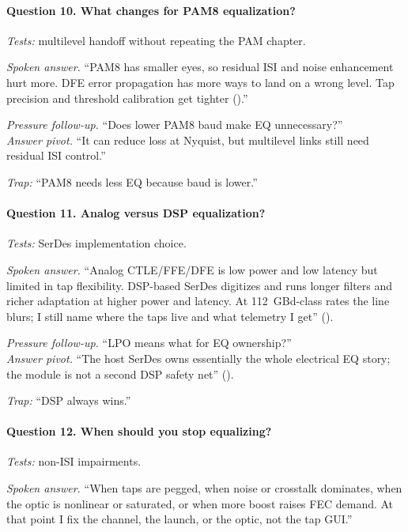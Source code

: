 \paragraph{Question 10. What changes for PAM8 equalization?}
\textit{Tests:} multilevel handoff without repeating the PAM chapter.

\textit{Spoken answer.}
``PAM8 has smaller eyes, so residual ISI and noise enhancement hurt more. DFE
error propagation has more ways to land on a wrong level. Tap precision and
threshold calibration get tighter ().''

\textit{Pressure follow-up.} ``Does lower PAM8 baud make EQ unnecessary?''\\
\textit{Answer pivot.} ``It can reduce loss at Nyquist, but multilevel links
still need residual ISI control.''

\textit{Trap:} ``PAM8 needs less EQ because baud is lower.''

\paragraph{Question 11. Analog versus DSP equalization?}
\textit{Tests:} SerDes implementation choice.

\textit{Spoken answer.}
``Analog CTLE/FFE/DFE is low power and low latency but limited in tap flexibility.
DSP-based SerDes digitizes and runs longer filters and richer adaptation at
higher power and latency. At 112~GBd-class rates the line blurs; I still name
where the taps live and what telemetry I get'' ().

\textit{Pressure follow-up.} ``LPO means what for EQ ownership?''\\
\textit{Answer pivot.} ``The host SerDes owns essentially the whole electrical
EQ story; the module is not a second DSP safety net''
().

\textit{Trap:} ``DSP always wins.''

\paragraph{Question 12. When should you stop equalizing?}
\textit{Tests:} non-ISI impairments.

\textit{Spoken answer.}
``When taps are pegged, when noise or crosstalk dominates, when the optic is
nonlinear or saturated, or when more boost raises FEC demand. At that point I
fix the channel, the launch, or the optic, not the tap GUI.''

